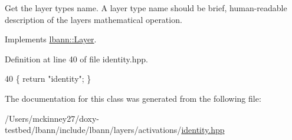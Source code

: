 Get the layer type\textquotesingle{}s name. A layer type name should be brief, human-\/readable description of the layer\textquotesingle{}s mathematical operation. 

Implements \hyperlink{classlbann_1_1Layer_a0fa0ea9160b490c151c0a17fde4f7239}{lbann\+::\+Layer}.



Definition at line 40 of file identity.\+hpp.


\begin{DoxyCode}
40 \{ \textcolor{keywordflow}{return} \textcolor{stringliteral}{"identity"}; \}
\end{DoxyCode}


The documentation for this class was generated from the following file\+:\begin{DoxyCompactItemize}
\item 
/\+Users/mckinney27/doxy-\/testbed/lbann/include/lbann/layers/activations/\hyperlink{identity_8hpp}{identity.\+hpp}\end{DoxyCompactItemize}
